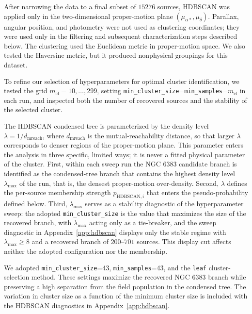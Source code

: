 \documentclass{aa}
\begin{document}
After narrowing the data to a final subset of $15276$ sources, \textsc{HDBSCAN} was applied only in the two-dimensional proper-motion plane $(\mu_{\alpha*},\mu_\delta)$. Parallax, angular position, and photometry were not used as clustering coordinates; they were used only in the filtering and subsequent characterization steps described below. The clustering used the Euclidean metric in proper-motion space. We also tested the Haversine metric, but it produced nonphysical groupings for this dataset.

To refine our selection of hyperparameters for optimal cluster identification, we tested the grid $m_{\mathrm{cl}}=10,\ldots,299$, setting \texttt{min\_cluster\_size}=\texttt{min\_samples}=$m_{\mathrm{cl}}$ in each run, and inspected both the number of recovered sources and the stability of the selected cluster.

The \textsc{HDBSCAN} condensed tree is parameterized by the density level $\lambda=1/d_{\mathrm{mreach}}$, where $d_{\mathrm{mreach}}$ is the mutual-reachability distance, so that larger $\lambda$ corresponds to denser regions of the proper-motion plane. This parameter enters the analysis in three specific, limited ways; it is never a fitted physical parameter of the cluster. First, within each sweep run the NGC 6383 candidate branch is identified as the condensed-tree branch that contains the highest density level $\lambda_{\mathrm{max}}$ of the run, that is, the densest proper-motion over-density. Second, $\lambda$ defines the per-source membership strength $p_{\mathrm{HDBSCAN},i}$ that enters the pseudo-probability defined below. Third, $\lambda_{\mathrm{max}}$ serves as a stability diagnostic of the hyperparameter sweep: the adopted \texttt{min\_cluster\_size} is the value that maximizes the size of the recovered branch, with $\lambda_{\mathrm{max}}$ acting only as a tie-breaker, and the sweep diagnostic in Appendix~\ref{app:hdbscan} displays only the stable regime with $\lambda_{\mathrm{max}}\geq8$ and a recovered branch of $200$--$701$ sources. This display cut affects neither the adopted configuration nor the membership.

We adopted \texttt{min\_cluster\_size}=43, \texttt{min\_samples}=43, and the \texttt{leaf} cluster-selection method. These settings maximize the recovered NGC 6383 branch while preserving a high separation from the field population in the condensed tree. The variation in cluster size as a function of the minimum cluster size is included with the HDBSCAN diagnostics in Appendix~\ref{app:hdbscan}.
\end{document}
